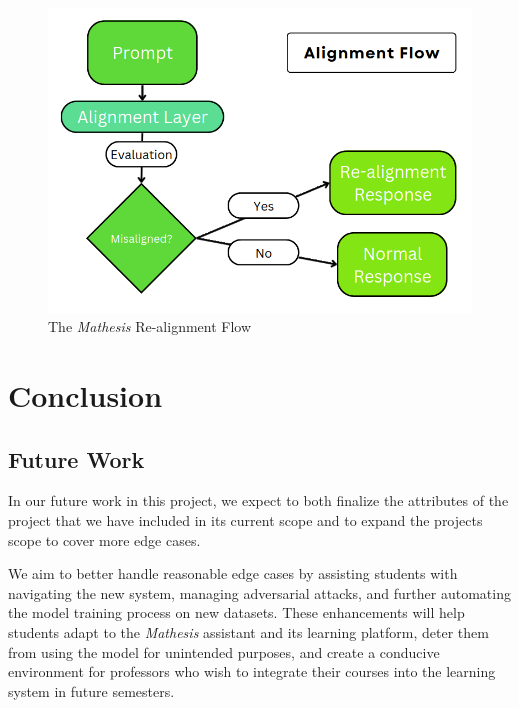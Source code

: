 \documentclass[12pt,a4paper]{article}
\begin{document}
    \begin{figure}[H]
        \begin{center}
            \begin{minipage}{0.6\textwidth}
            \centering
            \includegraphics[width=\linewidth]{images/realignment}
            \caption{The \textit{Mathesis} Re-alignment Flow}\label{Fig:realignment}
        \end{minipage}\hfill
        \end{center}
    \end{figure}

    \section{Conclusion}

    \subsection{Future Work}
    In our future work in this project, we expect to both finalize the attributes of the project that
    we have included in its current scope and to expand the projects scope to cover more edge cases.

    We aim to better handle reasonable edge cases by assisting students with navigating the new system,
    managing adversarial attacks, and further automating the model training process on new datasets.
    These enhancements will help students adapt to the \textit{Mathesis} assistant and its learning platform,
    deter them from using the model for unintended purposes, and create a conducive environment for
    professors who wish to integrate their courses into the learning system in future semesters.
\end{document}
